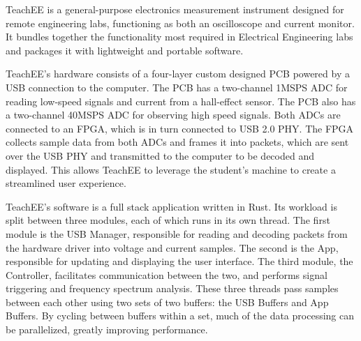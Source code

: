 \documentclass[letterpaper,11pt]{article}
\begin{document}
TeachEE is a general-purpose electronics measurement instrument designed for remote
engineering labs, functioning as both an oscilloscope and current monitor. It bundles
together the functionality most required in Electrical Engineering labs and packages
it with lightweight and portable software. 

TeachEE's hardware consists of a four-layer custom designed PCB powered by a USB
connection to the computer. The PCB has a two-channel 1MSPS ADC for reading low-speed
signals and current from a hall-effect sensor. The PCB also has a two-channel 40MSPS
ADC for observing high speed signals. Both ADCs are connected to an FPGA, which is in
turn connected to USB 2.0 PHY. The FPGA collects sample data from both ADCs and frames
it into packets, which are sent over the USB PHY and transmitted to the computer to be
decoded and displayed. This allows TeachEE to leverage the student's machine to create
a streamlined user experience. 

TeachEE's software is a full stack application written in Rust. Its workload is split
between three modules, each of which runs in its own thread. The first module is the
USB Manager, responsible for reading and decoding packets from the hardware driver
into voltage and current samples. The second is the App, responsible for updating and
displaying the user interface. The third module, the Controller, facilitates
communication between the two, and performs signal triggering and frequency spectrum
analysis. These three threads pass samples between each other using two sets of two
buffers: the USB Buffers and App Buffers. By cycling between buffers within a set,
much of the data processing can be parallelized, greatly improving performance. 

\newpage

\tableofcontents
\listoffigures
\listoftables
\newpage
\end{document}
